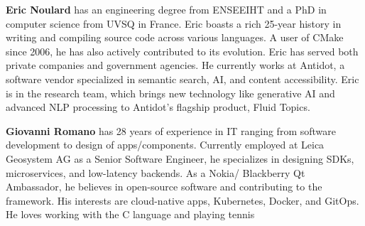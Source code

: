 \textbf{Eric Noulard} has an engineering degree from ENSEEIHT and a PhD in computer science from UVSQ in France. Eric boasts a rich 25-year history in writing and compiling source code across various languages. A user of CMake since 2006, he has also actively contributed to its evolution.
Eric has served both private companies and government agencies. He currently works at Antidot, a software vendor specialized in semantic search, AI, and content accessibility. Eric is in the research team, which brings new technology like generative AI and advanced NLP processing to Antidot’s flagship product, Fluid Topics.

\hspace*{\fill}
\hspace*{\fill}

\textbf{Giovanni Romano} has 28 years of experience in IT ranging from software development to design of apps/components. Currently employed at Leica Geosystem AG as a Senior Software Engineer, he specializes in designing SDKs, microservices, and low-latency backends. As a Nokia/ Blackberry Qt Ambassador, he believes in open-source software and contributing to the framework.
His interests are cloud-native apps, Kubernetes, Docker, and GitOps. He loves working with the C language and playing tennis